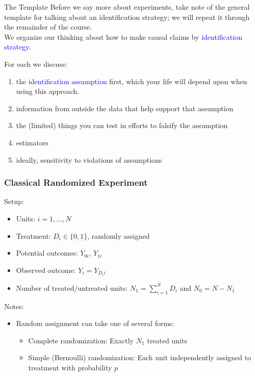 \documentclass[xcolor=dvipsnames]{beamer}
\newcommand\makegaps{\addtolength{\itemsep}{.25\baselineskip}}
\begin{document}
\begin{frame}{The Template}
Before we say more about experiments, take note of the general template for talking about an identification strategy; we will repeat it through the remainder of the course. \\

\bigskip
{} We organize our thinking about how to make causal claims by \textcolor{blue}{identification strategy}.\\

\bigskip

 For each we discuss:\\
\small
\begin{enumerate}
\item  the \textcolor{blue}{identification assumption} first, which your life will depend upon when using this approach.
\item information from outside the data that help support that assumption
\item the (limited) things you can test in efforts to falsify the assumption
\item estimators
\item ideally, sensitivity to violations of assumptions
\end{enumerate}
\end{frame}


\begin{frame}
\frametitle{Classical Randomized Experiment}
\small
Setup:
\begin{itemize}
\item Units: $i = 1, ..., N$
\item Treatment: $D_i \in \{0,1\}$, randomly assigned
\item Potential outcomes: $Y_{0i}$, $Y_{1i}$
\item Observed outcome: $Y_i = Y_{D_i{i}}$
\item Number of treated/untreated units: $N_1 = \sum_{i=1}^N D_i$ and $N_0 = N - N_1$
\end{itemize}

\pause
Notes:
\footnotesize
\begin{itemize}
\item Random assignment can take one of several forms:
	\begin{itemize}
	\scriptsize
	\makegaps
	\item \alert{Complete randomization}: Exactly $N_1$ treated units
	\item \alert{Simple (Bernoulli) randomization}: Each unit independently assigned to treatment with probability $p$
	\end{itemize}
\end{itemize}

\end{frame}
\end{document}
